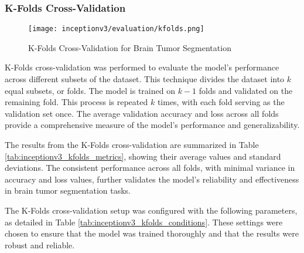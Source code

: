 \subsubsection{K-Folds Cross-Validation}

\begin{figure}[H]
  \begin{center}
    \texttt{[image: inceptionv3/evaluation/kfolds.png]}
  \end{center}
  \caption{K-Folds Cross-Validation for Brain Tumor Segmentation}\label{f:inceptionv3_kfolds}
\end{figure}

K-Folds cross-validation was performed to evaluate the model's performance across different subsets of the dataset. This technique divides the dataset into $k$ equal subsets, or folds. The model is trained on $k-1$ folds and validated on the remaining fold. This process is repeated $k$ times, with each fold serving as the validation set once. The average validation accuracy and loss across all folds provide a comprehensive measure of the model's performance and generalizability.

The results from the K-Folds cross-validation are summarized in Table \ref{tab:inceptionv3_kfolds_metrics}, showing their average values and standard deviations. The consistent performance across all folds, with minimal variance in accuracy and loss values, further validates the model's reliability and effectiveness in brain tumor segmentation tasks.

The K-Folds cross-validation setup was configured with the following parameters, as detailed in Table \ref{tab:inceptionv3_kfolds_conditions}. These settings were chosen to ensure that the model was trained thoroughly and that the results were robust and reliable.

